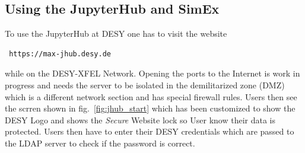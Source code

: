 \documentclass[10pt]{scrartcl}
\begin{document}
\subsection{Using the JupyterHub and SimEx}
To use the JupyterHub at DESY one has to visit the website
\begin{verbatim}
 https://max-jhub.desy.de
\end{verbatim}
while on the DESY-XFEL Network.
Opening the ports to the Internet is work in progress and needs the server to be isolated in the demilitarized zone (DMZ) which is a different network section and has special firewall rules.
Users then see the scrren shown in fig.~\ref{fig:jhub_start} which has been customized to show the DESY Logo and shows the \textit{Secure} Website lock so User know their data is protected.
Users then have to enter their DESY credentials which are passed to the LDAP server to check if the password is correct.
\end{document}
